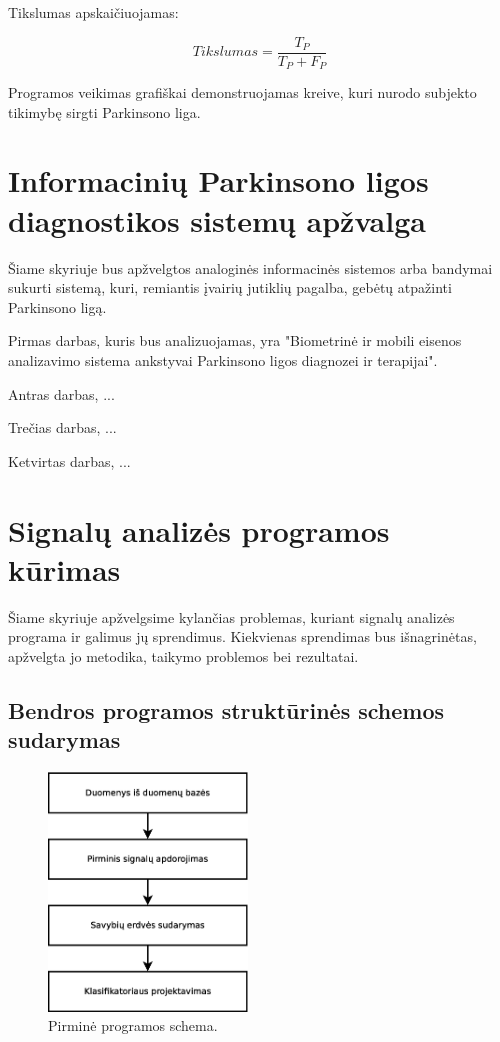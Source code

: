 \documentclass[10pt,onecolumn,draftcls]{IEEEtran}
\begin{document}
Tikslumas apskaičiuojamas:

\begin{equation}
Tikslumas = \frac{T_P}{T_P + F_P}
\end{equation}

Programos veikimas grafiškai demonstruojamas kreive, kuri nurodo
subjekto tikimybę sirgti Parkinsono liga.

\section{Informacinių Parkinsono ligos diagnostikos sistemų apžvalga}

Šiame skyriuje bus apžvelgtos analoginės informacinės sistemos arba
bandymai sukurti sistemą, kuri, remiantis įvairių jutiklių pagalba,
gebėtų atpažinti Parkinsono ligą.

Pirmas darbas, kuris bus analizuojamas, yra "Biometrinė ir mobili
eisenos analizavimo sistema ankstyvai Parkinsono ligos diagnozei ir %
terapijai". 

Antras darbas, ...

Trečias darbas, ...

Ketvirtas darbas, ...

\section{Signalų analizės programos kūrimas}

Šiame skyriuje apžvelgsime kylančias problemas, kuriant signalų
analizės programa ir galimus jų sprendimus. Kiekvienas sprendimas bus
išnagrinėtas, apžvelgta jo metodika, taikymo problemos bei rezultatai.


\subsection{Bendros programos struktūrinės schemos sudarymas}

\begin{figure}[!t]
  \centering
  \includegraphics[width=200px]{figures/pirmine_schema.eps}
  \caption{Pirminė programos schema.}
  \label{fig:pirmine_programos_schema}
\end{figure}
\end{document}

